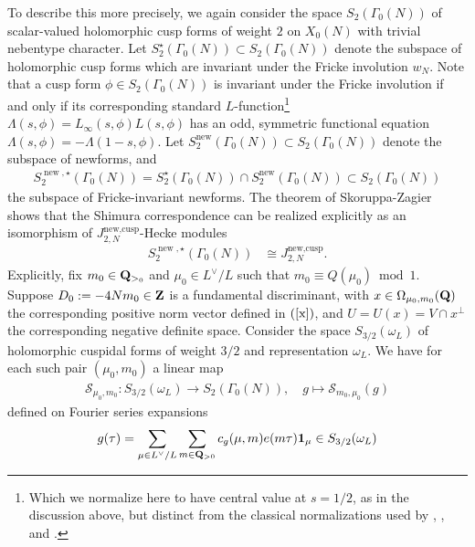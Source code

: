 \documentclass{amsart}
\theoremstyle{definition}
\theoremstyle{definition}
\theoremstyle{definition}
\begin{document}
To describe this more precisely, we again consider the space $S_2(\Gamma_0(N))$ of scalar-valued 
holomorphic cusp forms of weight $2$ on $X_0(N)$ with trivial nebentype character.
Let $S_2^{\star}(\Gamma_0(N)) \subset S_2(\Gamma_0(N))$ denote the subspace of holomorphic cusp forms 
which are invariant under the Fricke involution $w_N$.
Note that a cusp form $\phi \in S_2(\Gamma_0(N))$ is invariant under the Fricke involution if and only if its corresponding standard 
$L$-function\footnote{Which we normalize here to have central value at $s=1/2$, as in the discussion above, 
but distinct from the classical normalizations used by \cite[$\S$7.3]{BY}, \cite{GKZ}, and \cite{GZ}.} $\Lambda(s, \phi) = L_{\infty}(s, \phi) L(s, \phi)$
has an odd, symmetric functional equation $\Lambda(s, \phi) = - \Lambda(1-s, \phi)$.
Let $S_2^{\operatorname{new}}(\Gamma_0(N)) \subset S_2(\Gamma_0(N))$ denote the subspace of newforms, and  
\begin{align*} S_2^{\operatorname{new}, \star}(\Gamma_0(N)) = S_2^{\star}(\Gamma_0(N)) 
\cap S_2^{\operatorname{new}}(\Gamma_0(N)) \subset S_2(\Gamma_0(N)) \end{align*}
the subspace of Fricke-invariant newforms. The theorem of Skoruppa-Zagier \cite{SZ} 
shows that the Shimura correspondence can be realized explicitly as an isomorphism 
of $J_{2, N}^{\operatorname{new, cusp}}$-Hecke modules
\begin{align}\label{Shimura} S_2^{\operatorname{new}, \star}(\Gamma_0(N)) &\cong J_{2, N}^{\operatorname{new, cusp}}.\end{align}
Explicitly, fix $m_0 \in {\bf{Q}}_{>_0}$ and $\mu_0 \in L^{\vee}/L$ such that $m_0 \equiv Q(\mu_0) \bmod 1$. 
Suppose $D_0 := -4 N m_0 \in {\bf{Z}}$ is a fundamental discriminant, 
with $x \in \Omega_{\mu_0, m_0}({\bf{Q}})$ the corresponding positive norm vector defined in $(\ref{x})$,
and $U = U(x) = V \cap x^{\perp}$ the corresponding negative definite space. 
Consider the space $S_{3/2}(\omega_L)$ of holomorphic cuspidal forms of weight $3/2$ and representation $\omega_L$. 
We have for each such pair $(\mu_0, m_0)$ a linear map 
\begin{align*} \mathcal{S}_{\mu_0, m_0}: S_{3/2}(\omega_L) \longrightarrow S_2(\Gamma_0(N)), \quad g \longmapsto \mathcal{S}_{m_0, \mu_0}(g) \end{align*} 
defined on Fourier series expansions
\begin{align*} g(\tau) = \sum\limits_{\mu \in L^{\vee}/L} \sum\limits_{m \in {\bf{Q}}_{>0}} c_g(\mu, m) e(m \tau) {\bf{1}}_{\mu} \in S_{3/2}(\omega_L)\end{align*}
\end{document}
